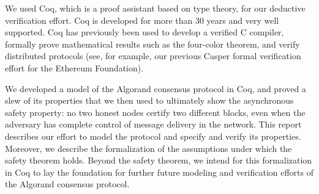 We used Coq, which is a proof assistant based on type theory, for our deductive verification effort. Coq is developed for more than 30 years and very well supported. Coq has previously been used to develop a verified C compiler, formally prove mathematical results such as the four-color theorem, and verify distributed protocols (see, for example, our previous Casper formal verification effort for the Ethereum Foundation).

We developed a model of the Algorand consensus protocol in Coq, and proved a slew of its properties that we then used to ultimately show the asynchronous safety property: no two honest nodes certify two different blocks, even when the adversary has complete control of message delivery in the network. This report describes our effort to model the protocol and specify and verify its properties. Moreover, we describe the formalization of the assumptions under which the safety theorem holds. Beyond the safety theorem, we intend for this formalization in Coq to lay the foundation for further future modeling and verification efforts of the Algorand consensus protocol.

